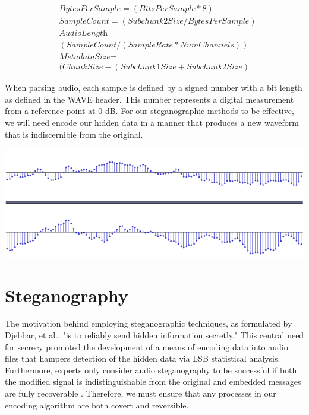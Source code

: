 \begin{align*}
&\textit{BytesPerSample} = (BitsPerSample * 8) \\
&\textit{SampleCount} = (Subchunk2Size / BytesPerSample) \\
&\textit{AudioLength} = \\
&{(SampleCount / (SampleRate * NumChannels))} \\
&\textit{MetadataSize} = \\
&{(ChunkSize - (Subchunk1Size + Subchunk2Size)}
\end{align*}

When parsing audio, each sample is defined by a signed number with a bit length as defined in the WAVE header. This number represents a digital measurement from a reference point at 0 dB. For our steganographic methods to be effective, we will need encode our hidden data in a manner that produces a new waveform that is indiscernible from the original.

\noindent
\includegraphics[width=\columnwidth]{images/sample_rate.png}

\section{Steganography}
The motivation behind employing steganographic techniques, as formulated by Djebbar, et al., "is to reliably send hidden information secretly." \cite{paper9} This central need for secrecy promoted the development of a means of encoding data into audio files that hampers detection of the hidden data via LSB statistical analysis. Furthermore, experts only consider audio steganography to be successful if both the modified signal is indistinguishable from the original and embedded messages are fully recoverable \cite{paper3}. Therefore, we must ensure that any processes in our encoding algorithm are both covert and reversible. 

